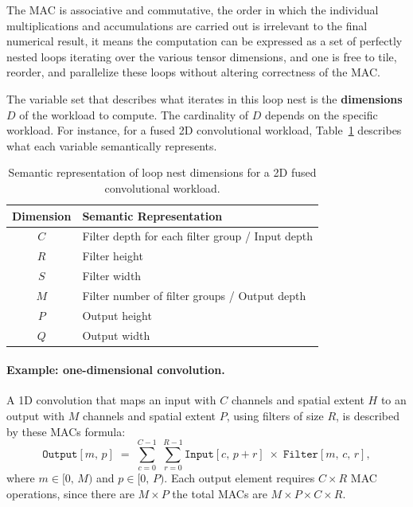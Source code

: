 The MAC is associative and commutative, the order in which the
individual multiplications and accumulations are carried out is
irrelevant to the final numerical result, it means the computation can be expressed as
a set of perfectly nested loops iterating over the various tensor
dimensions, and one is free to tile, reorder, and parallelize these loops
without altering correctness of the MAC.
            
The variable set that describes what iterates in this loop nest is the \textbf{dimensions} $D$ of the workload to compute. The cardinality of $D$ depends on the specific workload. For instance, for a fused 2D convolutional workload, Table~\ref{tab:dimension-semantics} describes what each variable semantically represents.

\begin{table}[htbp]
  \centering
  \caption{Semantic representation of loop nest dimensions for a 2D fused convolutional workload.}
  \label{tab:dimension-semantics}
  \small
  \begin{tabular}{cl}
    \toprule
    \textbf{Dimension} & \textbf{Semantic Representation} \\
    \midrule
    $C$& Filter depth for each filter group / Input depth \\
    $R$ & Filter height \\
    $S$ & Filter width \\
    $M$& Filter number of filter groups / Output depth \\
    $P$   & Output height \\
    $Q$   & Output width \\
    \bottomrule
  \end{tabular}
\end{table}                 

\paragraph{Example: one-dimensional convolution.}
A 1D convolution that maps an
input with $C$ channels and spatial extent $H$ to an output with $M$
channels and spatial extent $P$, using filters of size $R$, is described by these MACs formula:
\begin{equation}
\label{eq:1dconv}
\texttt{Output}[m,\, p] \;=\; \sum_{c=0}^{C-1}\;\sum_{r=0}^{R-1}
  \texttt{Input}[c,\, p{+}r]\;\times\;\texttt{Filter}[m,\, c,\, r],
\end{equation}
where $m \in [0,\,M)$ and $p \in [0,\,P)$.
Each output element requires $C \times R$ MAC operations, since there are $M\times P$  the total
MACs are $M \times P \times C \times R$.

